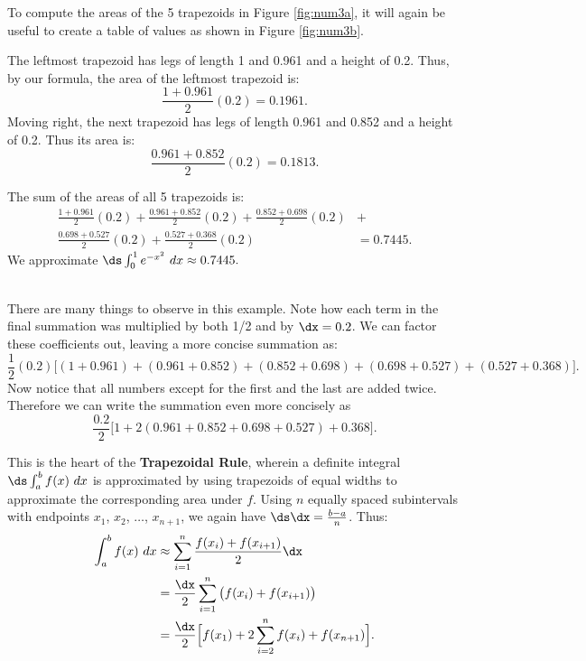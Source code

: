 {To compute the areas of the 5 trapezoids in Figure \ref{fig:num3a}, it will again be useful to create a table of values as shown in Figure \ref{fig:num3b}.


The leftmost trapezoid has legs of length 1 and 0.961 and a height of 0.2. Thus, by our formula, the area of the leftmost trapezoid is: $$ \frac{1+0.961}{2}(0.2) = 0.1961.$$
Moving right, the next trapezoid has legs of length 0.961 and 0.852 and a height of 0.2. Thus its area is: $$\frac{0.961+0.852}2(0.2) = 0.1813.$$

The sum of the areas of all 5 trapezoids is:
\begin{align*}
\frac{1+0.961}{2}(0.2) + \frac{0.961+0.852}2(0.2)+\frac{0.852+0.698}2(0.2)&+ \\
\frac{0.698+0.527}2(0.2)+\frac{0.527+0.368}2(0.2)&= 0.7445.
\end{align*}
We approximate $\ds \int_0^1 e^{-x^2}\ dx \approx 0.7445.$
}\\

There are many things to observe in this example. Note how each term in the final summation was multiplied by both 1/2 and by $\dx = 0.2$. We can factor these coefficients out, leaving a more concise summation as:\small
$$
\frac12(0.2)\Big[(1+0.961) + (0.961+0.852) + (0.852+0.698) + ( 0.698+ 0.527) +(0.527 + 0.368)\Big].$$
\normalsize
Now notice that all numbers except for the first and the last are added twice. Therefore we can write the summation even more concisely as
$$\frac{0.2}{2}\Big[1 + 2(0.961+0.852+0.698+0.527) + 0.368\Big].$$

This is the heart of the \textbf{Trapezoidal Rule}, wherein a definite integral $\ds \int_a^b f(x) \ dx$ is approximated by using trapezoids of equal widths to approximate the corresponding area under $f$. Using $n$ equally spaced subintervals with endpoints $x_1$, $x_2$, $\ldots$, $x_{n+1}$, we again have $\ds \dx = \frac{b-a}n$. Thus:
\begin{align*}
\int_a^b f(x)\ dx & \approx \sum_{i=1}^n \frac{f(x_i)+f(x_{i+1})}2\dx \\
									& = \frac{\dx}2 \sum_{i=1}^n \big(f(x_i)+f(x_{i+1})\big)\\
									& = \frac{\dx}2\Big[f(x_1)+ 2\sum_{i=2}^n f(x_i) + f(x_{n+1})\Big].\\ 
\end{align*}

